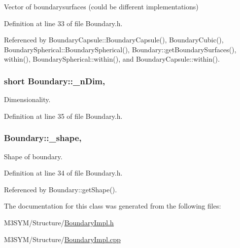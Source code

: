 Vector of boundarysurfaces (could be different implementations) 



Definition at line 33 of file Boundary.\+h.



Referenced by Boundary\+Capsule\+::\+Boundary\+Capsule(), Boundary\+Cubic(), Boundary\+Spherical\+::\+Boundary\+Spherical(), Boundary\+::get\+Boundary\+Surfaces(), within(), Boundary\+Spherical\+::within(), and Boundary\+Capsule\+::within().

\hypertarget{classBoundary_a96f2294e0c822ab216fe5ab7e17258c7}{
\subsubsection[{\+\_\+n\+Dim}]{\setlength{\rightskip}{0pt plus 5cm}short Boundary\+::\+\_\+n\+Dim\hspace{0.3cm}{\ttfamily [protected]}, {\ttfamily [inherited]}}}\label{classBoundary_a96f2294e0c822ab216fe5ab7e17258c7}


Dimensionality. 



Definition at line 35 of file Boundary.\+h.

\hypertarget{classBoundary_a04c10c9a7aea1924d779d392e29f94ff}{
\subsubsection[{\+\_\+shape}]{ Boundary\+::\+\_\+shape\hspace{0.3cm}{\ttfamily [protected]}, {\ttfamily [inherited]}}}\label{classBoundary_a04c10c9a7aea1924d779d392e29f94ff}


Shape of boundary. 



Definition at line 34 of file Boundary.\+h.



Referenced by Boundary\+::get\+Shape().



The documentation for this class was generated from the following files\+:\begin{DoxyCompactItemize}
\item 
M3\+S\+Y\+M/\+Structure/\hyperlink{BoundaryImpl_8h}{Boundary\+Impl.\+h}\item 
M3\+S\+Y\+M/\+Structure/\hyperlink{BoundaryImpl_8cpp}{Boundary\+Impl.\+cpp}\end{DoxyCompactItemize}

